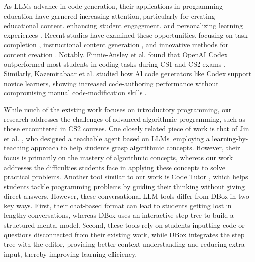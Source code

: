 As LLMs advance in code generation, their applications in programming education have garnered increasing attention, particularly for creating educational content, enhancing student engagement, and personalizing learning experiences \cite{kasneci2023chatgpt}. Recent studies have examined these opportunities, focusing on task completion \cite{denny2023conversing}, instructional content generation \cite{leinonen2023using}, and innovative methods for content creation \cite{denny2022robosourcing}. Notably, Finnie-Ansley et al. found that OpenAI Codex outperformed most students in coding tasks during CS1 and CS2 exams \cite{finnie2023my}. Similarly, Kazemitabaar et al. studied how AI code generators like Codex support novice learners, showing increased code-authoring performance without compromising manual code-modification skills \cite{kazemitabaar2023novices}.

While much of the existing work focuses on introductory programming, our research addresses the challenges of advanced algorithmic programming, such as those encountered in CS2 courses. One closely related piece of work is that of Jin et al. \cite{jin2024teach}, who designed a teachable agent based on LLMs, employing a learning-by-teaching approach to help students grasp algorithmic concepts. However, their focus is primarily on the mastery of algorithmic concepts, whereas our work addresses the difficulties students face in applying these concepts to solve practical problems. Another tool similar to our work is Code Tutor \cite{codetutor}, which helps students tackle programming problems by guiding their thinking without giving direct answers. However, these conversational LLM tools differ from DBox in two key ways. First, their chat-based format can lead to students getting lost in lengthy conversations, whereas DBox uses an interactive step tree to build a structured mental model. Second, these tools rely on students inputting code or questions disconnected from their existing work, while DBox integrates the step tree with the editor, providing better context understanding and reducing extra input, thereby improving learning efficiency.






